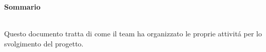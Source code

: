 \noindent\begin{Large}\textbf{Sommario}\end{Large}\\

\noindent Questo documento tratta di come il team \gruppo  ha organizzato le proprie attivit\'a per lo svolgimento del progetto. \\